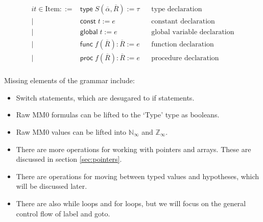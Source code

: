 \documentclass[acmsmall,nonacm]{acmart}
\newcommand*{\N}{\mathbb{N}}
\newcommand*{\Z}{\mathbb{Z}}
\begin{document}
\begin{align*}
  it \in \mathrm{Item} ::={}&\mathsf{type}\;S(\overline{\alpha}, \overline{R}):=\tau&&\mbox{type declaration}\\
    \mid{}&\mathsf{const}\;t:=e&&\mbox{constant declaration}\\
    \mid{}&\mathsf{global}\;t:=e&&\mbox{global variable declaration}\\
    \mid{}&\mathsf{func}\;f(\overline{R}):\overline{R}:=e&&\mbox{function declaration}\\
    \mid{}&\mathsf{proc}\;f(\overline{R}):\overline{R}:=e&&\mbox{procedure declaration}\\
\end{align*}

Missing elements of the grammar include:
\begin{itemize}
  \item Switch statements, which are desugared to if statements.
  \item Raw MM0 formulas can be lifted to the `Type' type as booleans.
  \item Raw MM0 values can be lifted into $\N_\infty$ and $\Z_\infty$.
  \item There are more operations for working with pointers and arrays. These are discussed in section \ref{sec:pointers}.
  \item There are operations for moving between typed values and hypotheses, which will be discussed later.
  \item There are also \textsf{while} loops and \textsf{for} loops, but we will focus on the general control flow of \textsf{label} and \textsf{goto}.
\end{itemize}
\end{document}
